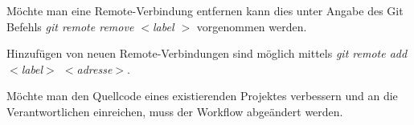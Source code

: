 Möchte man eine Remote-Verbindung entfernen kann dies unter Angabe des Git Befehls \textit{git remote remove  $ < $label $ > $} vorgenommen werden. 
  
Hinzufügen von neuen Remote-Verbindungen sind möglich mittels \textit{git remote add $ < $label$ > $ $ < $adresse$ > $}.

\begin{INFO}
  Möchte man den Quellcode eines existierenden Projektes verbessern und an die Verantwortlichen einreichen, muss der Workflow abgeändert werden.
  
  
\end{INFO}
